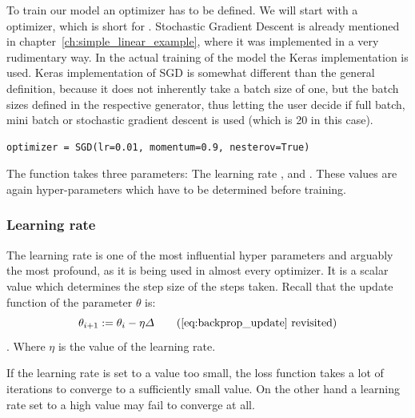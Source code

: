 To train our model an optimizer has to be defined.
We will start with a  optimizer, which is short for . Stochastic Gradient Descent is already mentioned in chapter~\ref{ch:simple_linear_example}, where it was implemented in a very rudimentary way. In the actual training of the model the Keras implementation is used.
Keras implementation of SGD is somewhat different than the general definition, because it does not inherently take a batch size of one, but the batch sizes defined in the respective generator, thus letting the user decide if full batch, mini batch or stochastic gradient descent is used (which is 20 in this case).

\begin{lstlisting}
optimizer = SGD(lr=0.01, momentum=0.9, nesterov=True)
\end{lstlisting}

The  function takes three parameters: The learning rate ,  and .
These values are again hyper-parameters which have to be determined before training.

\subsubsection{Learning rate}

The learning rate is one of the most influential hyper parameters and arguably the most profound, as it is being used in almost every optimizer.
It is a scalar value which determines the step size of the steps taken. Recall that the update function of the parameter $\theta$ is:
\begin{equation}
    \theta_{i+1} := \theta_i - \eta \varDelta \tag{\ref{eq:backprop_update} revisited}
\end{equation}.
Where $\eta$ is the value of the learning rate.

If the learning rate is set to a value too small, the loss function takes a lot of iterations to converge to a sufficiently small value.
On the other hand a learning rate set to a high value may fail to converge at all.

